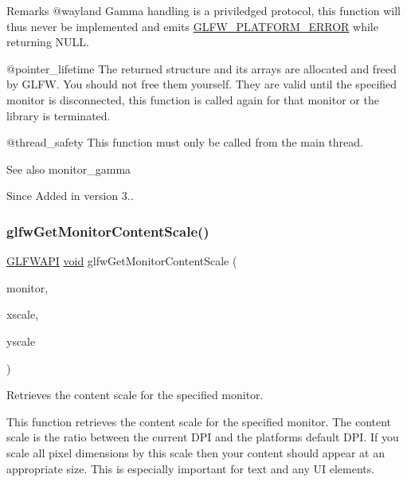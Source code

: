 \begin{DoxyRemark}{Remarks}
@wayland Gamma handling is a priviledged protocol, this function will thus never be implemented and emits \mbox{\hyperlink{group__errors_gad44162d78100ea5e87cdd38426b8c7a1}{G\+L\+F\+W\+\_\+\+P\+L\+A\+T\+F\+O\+R\+M\+\_\+\+E\+R\+R\+OR}} while returning {\ttfamily N\+U\+LL}.
\end{DoxyRemark}
@pointer\+\_\+lifetime The returned structure and its arrays are allocated and freed by G\+L\+FW. You should not free them yourself. They are valid until the specified monitor is disconnected, this function is called again for that monitor or the library is terminated.

@thread\+\_\+safety This function must only be called from the main thread.

\begin{DoxySeeAlso}{See also}
monitor\+\_\+gamma
\end{DoxySeeAlso}
\begin{DoxySince}{Since}
Added in version 3.. 
\end{DoxySince}
\mbox{\label{group__monitor_ga28d856d94bea2ce8f09a67bb0346aaff}} 
\subsubsection{\texorpdfstring{glfwGetMonitorContentScale()}{glfwGetMonitorContentScale()}}
{\footnotesize\ttfamily \mbox{\hyperlink{glfw3_8h_a56da5036b2cc259351ae22fd6439bb47}{G\+L\+F\+W\+A\+PI}} \mbox{\hyperlink{glad_8h_a950fc91edb4504f62f1c577bf4727c29}{void}} glfw\+Get\+Monitor\+Content\+Scale (\begin{DoxyParamCaption}\item[{\mbox{\hyperlink{group__monitor_ga8d9efd1cde9426692c73fe40437d0ae3}{G\+L\+F\+Wmonitor}} $\ast$}]{monitor,  }\item[{float $\ast$}]{xscale,  }\item[{float $\ast$}]{yscale }\end{DoxyParamCaption})}



Retrieves the content scale for the specified monitor. 

This function retrieves the content scale for the specified monitor. The content scale is the ratio between the current D\+PI and the platform\textquotesingle{}s default D\+PI. If you scale all pixel dimensions by this scale then your content should appear at an appropriate size. This is especially important for text and any UI elements.

